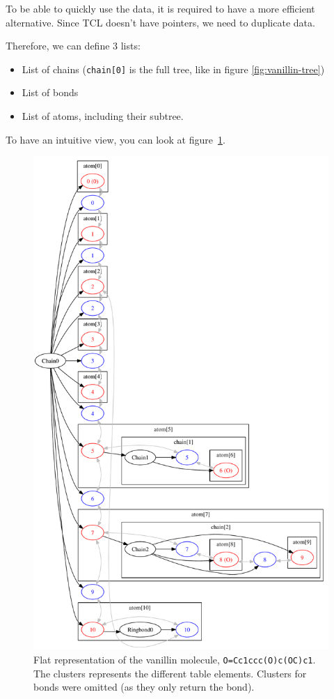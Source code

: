 \documentclass[a4paper, 11pt]{article}
\begin{document}
To be able to quickly use the data, it is required to have a more efficient alternative. Since TCL doesn't have pointers, we need to duplicate data.

Therefore, we can define 3 lists:
\begin{itemize}
    \item List of chains ({\tt chain[0]} is the full tree, like in figure \ref{fig:vanillin-tree})
    \item List of bonds
    \item List of atoms, including their subtree.
\end{itemize}

To have an intuitive view, you can look at figure~\ref{fig:vanillin-flat}.

\begin{figure}
    \begin{center}
        \includegraphics[width=0.8\columnwidth]{images/Vanillin-flat.pdf}
    \end{center}
    \caption[Flat representation of the vanillin molecule]{\label{fig:vanillin-flat} Flat representation of the vanillin molecule, {\tt O=Cc1ccc(O)c(OC)c1}. The clusters represents the different table elements. Clusters for bonds were omitted (as they only return the bond).}
\end{figure}
\end{document}
